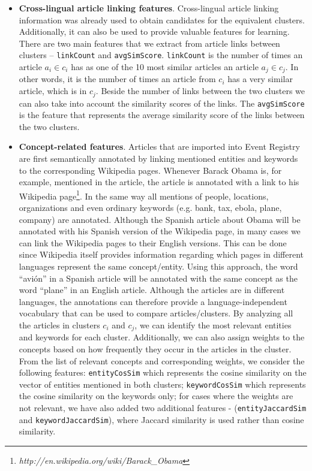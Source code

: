 \documentclass[twoside,11pt]{article}
\begin{document}
\begin{itemize}
\item {\bf Cross-lingual article linking features}. Cross-lingual article linking information was already used to obtain candidates for the equivalent clusters. Additionally, it can also be used to provide valuable  features for learning. There are two main features that we extract from article links between clusters -- \texttt{linkCount} and \texttt{avgSimScore}. \texttt{linkCount} is the number of times an article $a_i \in c_i$ has as one of the 10 most similar articles an article $a_j \in c_j$. In other words, it is the number of times an article from $c_i$ has a very similar article, which is in $c_j$. Beside the number of links between the two clusters we can also take into account the similarity scores of the links. The \texttt{avgSimScore} is the feature that represents the average similarity score of the links between the two clusters.

\item {\bf Concept-related features}. Articles that are imported into Event Registry are first semantically annotated by linking mentioned entities and keywords to the corresponding Wikipedia pages. Whenever Barack Obama is, for example, mentioned in the article, the article is annotated with a link to his Wikipedia page\footnote{\emph{http://en.wikipedia.org/wiki/Barack\_Obama}}. In the same way all mentions of people, locations, organizations and even ordinary keywords (e.g. bank, tax, ebola, plane, company) are annotated. Although the Spanish article about Obama will be annotated with his Spanish version of the Wikipedia page, in many cases we can link the Wikipedia pages to their English versions. This can be done since Wikipedia itself provides information regarding which pages in different languages represent the same concept/entity. Using this approach, the word ``avi\'on'' in a Spanish article will be annotated with the same concept as the word ``plane'' in an English article. Although the articles are in different languages, the annotations can therefore provide a language-independent vocabulary that can be used to compare articles/clusters. By analyzing all the articles in clusters $c_i$ and $c_j$, we can identify the most relevant entities and keywords for each cluster. Additionally, we can also assign weights to the concepts based on how frequently they occur in the articles in the cluster. From the list of relevant concepts and corresponding weights, we consider the following features: \texttt{entityCosSim} which represents the cosine similarity on the vector of entities mentioned in both clusters; \texttt{keywordCosSim} which represents the cosine similarity on the keywords only; for cases where the weights are not relevant, we have also added two additional features - (\texttt{entityJaccardSim} and \texttt{keywordJaccardSim}), where Jaccard similarity is used rather than cosine similarity.


\end{itemize}
\end{document}
